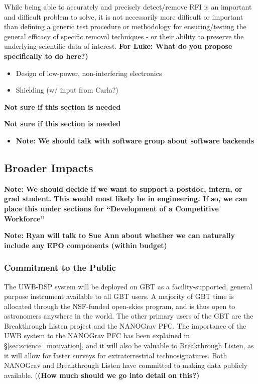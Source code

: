 \documentclass[10pt]{myNSF}
\begin{document}
 While being able to
accurately and precisely detect/remove RFI is an important and
difficult problem to solve, it is not necessarily more difficult or
important than defining a generic test procedure or methodology for
ensuring/testing the general efficacy of specific removal techniques -
or their ability to preserve the underlying scientific data of
interest. \textbf{For Luke: What do you propose specifically to do
  here?)}

\begin{itemize}
\item{Design of low-power, non-interfering electronics}
\item{Shielding (w/ input from Carla?)}
\end{itemize}

 \textbf{Not sure if this
  section is needed}

 \textbf{Not sure if this
  section is needed}
\begin{itemize}
\item{\textbf{Note: We should talk with software group about
      software backends}}
\end{itemize}

\subsection{Broader Impacts}
\label{sec:BI}

\textbf{Note: We should decide if we want to support a postdoc,
  intern, or grad student.  This would most likely be in engineering.
  If so, we can place this under sections for ``Development of a
  Competitive Workforce''}

\textbf{Note: Ryan will talk to Sue Ann about whether we can naturally
  include any EPO components (within budget)}

\subsubsection{Commitment to the Public}
\label{sec:commitment}

The UWB-DSP system will be deployed on GBT as a facility-supported,
general purpose instrument available to all GBT users.  A majority of
GBT time is allocated through the NSF-funded open-skies program, and
is thus open to astronomers anywhere in the world.  The other primary
users of the GBT are the Breakthrough Listen project and the NANOGrav
PFC.  The importance of the UWB system to the NANOGrav PFC has been
explained in \S\ref{sec:science_motivation}, and it will also be
valuable to Breakthrough Listen, as it will allow for faster surveys
for extraterrestrial technosignatures.  Both NANOGrav and Breakthrough
Listen have committed to making data publicly available. (\textbf{(How
  much should we go into detail on this?)}
\end{document}

